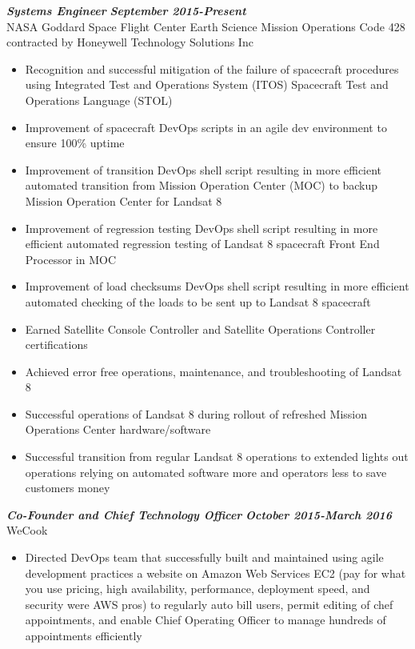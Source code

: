 \documentclass{res}
\begin{document}
\begin{resume}
	{\bfseries {\em Systems Engineer}}  \hfill  {\bfseries{\em September 2015-Present}}\\
		NASA Goddard Space Flight Center Earth Science Mission Operations Code 428\\
		contracted by Honeywell Technology Solutions Inc
                \begin{itemize}  \itemsep -2pt %
		\item Recognition and successful mitigation of the failure of spacecraft procedures using Integrated Test and Operations System (ITOS) Spacecraft Test and Operations Language (STOL)
		\item Improvement of spacecraft DevOps scripts in an agile dev environment to ensure 100\% uptime
		\item Improvement of transition DevOps shell script resulting in more efficient automated transition from Mission Operation Center (MOC) to backup Mission Operation Center for Landsat 8
		\item Improvement of regression testing DevOps shell script resulting in more efficient automated regression testing of Landsat 8 spacecraft Front End Processor in MOC
		\item Improvement of load checksums  DevOps shell script resulting in more efficient automated checking of the loads to be sent up to Landsat 8 spacecraft
		\item Earned Satellite Console Controller and Satellite Operations Controller certifications
		\item Achieved error free operations, maintenance, and troubleshooting of Landsat 8
		\item Successful operations of Landsat 8 during rollout of refreshed Mission Operations Center hardware/software
		\item Successful transition from regular Landsat 8 operations to extended lights out operations relying on automated software more and operators less to save customers money
                \end{itemize}
	{\bfseries {\em Co-Founder and Chief Technology Officer}}  \hfill  {\bfseries{\em October 2015-March 2016}}\\
		WeCook
                \begin{itemize}  \itemsep -2pt %
		\item Directed DevOps team that successfully built and maintained using agile development practices a website on Amazon Web Services EC2 (pay for what you use pricing, high availability, performance, deployment speed, and security were AWS pros) to regularly auto bill users, permit editing of chef appointments, and enable Chief Operating Officer to manage hundreds of appointments efficiently

\end{itemize}
\end{resume}
\end{document}
